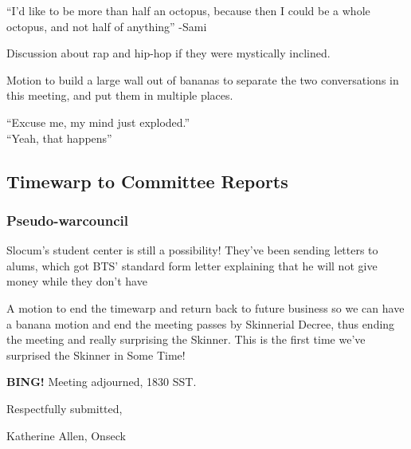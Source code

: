\documentclass[10pt]{article}
\newcommand{\bing}{{\bf BING!} }
\begin{document}
``I'd like to be more than half an octopus, because then I could be a
whole octopus, and not half of anything'' -Sami

Discussion about rap and hip-hop if they were mystically inclined.

Motion to build a large wall out of bananas to separate the two
conversations in this meeting, and put them in multiple places.

``Excuse me, my mind just exploded.''\\
``Yeah, that happens''

\subsection{Timewarp to Committee Reports}
\subsubsection{Pseudo-warcouncil}
Slocum's student center is still a possibility!  They've been sending
letters to alums, which got BTS' standard form letter explaining that
he will not give money while they don't have

A motion to end the timewarp and return back to future business so we
can have a banana motion and end the meeting passes by Skinnerial
Decree, thus ending the meeting and really surprising the Skinner.
This is the first time we've surprised the Skinner in Some Time!

\bing
\noindent
Meeting adjourned, 1830 SST.

\vspace{18pt}

\centerline{Respectfully submitted,}
\centerline{Katherine Allen, Onseck}
\end{document}
